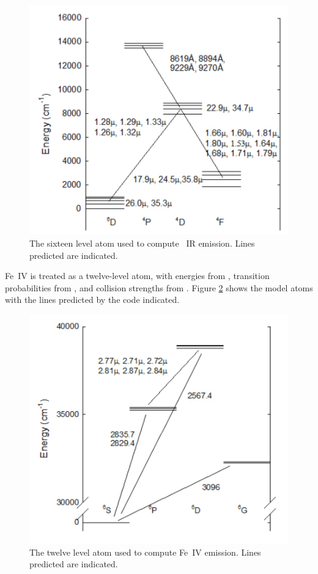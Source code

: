 \begin{figure}
\centering
\label{fig:FeII_model}
\includegraphics[scale=0.7]{FeII_model}
\caption[\feii\ model of low-lying levels]{The sixteen level atom used to compute \feii\ IR emission.  Lines
predicted are indicated.}
\end{figure}

Fe~IV is treated as a twelve-level atom, with energies from
\citet{Sugar1985}, transition probabilities from \citet{Garstang1958}, and collision
strengths from \citet{Berrington1995}.
Figure \ref{fig:FeIV_model} shows the model atoms
with the lines predicted by the code indicated.

\begin{figure}
\centering
\label{fig:FeIV_model}
\includegraphics[scale=0.8]{FeIV_model}
\caption[Fe~IV model atom]{The twelve level atom used to compute Fe~IV emission.  Lines
predicted are indicated.}
\end{figure}

